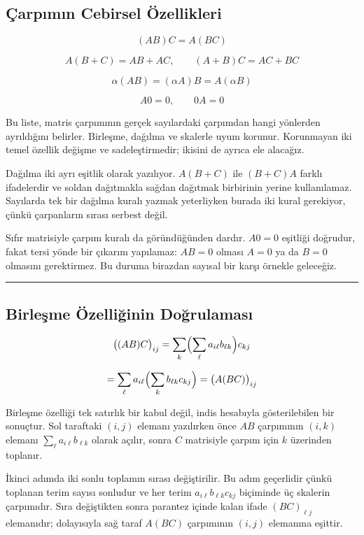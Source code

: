 \documentclass[
  letterpaper,
  DIV=11,
  numbers=noendperiod]{scrartcl}
\begin{document}
\subsection{Çarpımın Cebirsel
Özellikleri}\label{uxe7arpux131mux131n-cebirsel-uxf6zellikleri}

\[
(AB)C=A(BC)
\]

\[
A(B+C)=AB+AC,
\qquad
(A+B)C=AC+BC
\]

\[
\alpha(AB)=(\alpha A)B=A(\alpha B)
\]

\[
A0=0,
\qquad
0A=0
\]

Bu liste, matris çarpımının gerçek sayılardaki çarpımdan hangi yönlerden
ayrıldığını belirler. Birleşme, dağılma ve skalerle uyum korunur.
Korunmayan iki temel özellik değişme ve sadeleştirmedir; ikisini de
ayrıca ele alacağız.

Dağılma iki ayrı eşitlik olarak yazılıyor. \(A(B+C)\) ile \((B+C)A\)
farklı ifadelerdir ve soldan dağıtmakla sağdan dağıtmak birbirinin
yerine kullanılamaz. Sayılarda tek bir dağılma kuralı yazmak yeterliyken
burada iki kural gerekiyor, çünkü çarpanların sırası serbest değil.

Sıfır matrisiyle çarpım kuralı da göründüğünden dardır. \(A0=0\)
eşitliği doğrudur, fakat tersi yönde bir çıkarım yapılamaz: \(AB=0\)
olması \(A=0\) ya da \(B=0\) olmasını gerektirmez. Bu duruma birazdan
sayısal bir karşı örnekle geleceğiz.

\begin{center}\rule{0.5\linewidth}{0.5pt}\end{center}

\subsection{Birleşme Özelliğinin
Doğrulaması}\label{birleux15fme-uxf6zelliux11finin-doux11frulamasux131}

\[
\bigl((AB)C\bigr)_{ij}
=\sum_{k}\Bigl(\sum_{\ell}a_{i\ell}b_{\ell k}\Bigr)c_{kj}
\]

\[
=\sum_{\ell}a_{i\ell}\Bigl(\sum_{k}b_{\ell k}c_{kj}\Bigr)
=\bigl(A(BC)\bigr)_{ij}
\]

Birleşme özelliği tek satırlık bir kabul değil, indis hesabıyla
gösterilebilen bir sonuçtur. Sol taraftaki \((i,j)\) elemanı yazılırken
önce \(AB\) çarpımının \((i,k)\) elemanı
\(\sum_\ell a_{i\ell}b_{\ell k}\) olarak açılır, sonra \(C\) matrisiyle
çarpım için \(k\) üzerinden toplanır.

İkinci adımda iki sonlu toplamın sırası değiştirilir. Bu adım geçerlidir
çünkü toplanan terim sayısı sonludur ve her terim
\(a_{i\ell}b_{\ell k}c_{kj}\) biçiminde üç skalerin çarpımıdır. Sıra
değiştikten sonra parantez içinde kalan ifade \((BC)_{\ell j}\)
elemanıdır; dolayısıyla sağ taraf \(A(BC)\) çarpımının \((i,j)\)
elemanına eşittir.
\end{document}
